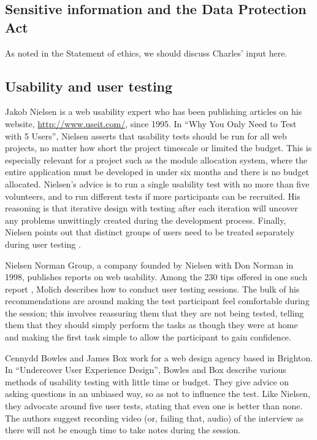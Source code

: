 \documentclass[]{scrartcl}
\begin{document}
\subsection{Sensitive information and the Data Protection Act}
\label{sec:dataprotection}

As noted in the Statement of ethics, we should discuss Charles' input here.

\subsection{Usability and user testing}

Jakob Nielsen is a web usability expert who has been publishing articles on
his website, \url{http://www.useit.com/}, since 1995. In ``Why You Only Need to
Test with 5 Users'', Nielsen asserts that usability tests should be run for all
web projects, no matter how short the project timescale or limited the budget.
This is especially relevant for a project such as the module allocation
system, where the entire application must be developed in under six months and
there is no budget allocated. Nielsen's advice is to run a single usability
test with no more than five volunteers, and to run different tests if more
participants can be recruited. His reasoning is that iterative design with
testing after each iteration will uncover any problems unwittingly created
during the development process. Finally, Nielsen points out that distinct
groups of users need to be treated separately during user testing
\cite{nielsen2000fiveusers}.

Nielsen Norman Group, a company founded by Nielsen with Don Norman in 1998,
publishes reports on web usability. Among the 230 tips offered in one such
report \cite{nng2001tipsusability}, Molich describes how to conduct user
testing sessions. The bulk of his recommendations are around making the test
participant feel comfortable during the session; this involves reassuring them
that they are not being tested, telling them that they should simply perform
the tasks as though they were at home and making the first task simple to
allow the participant to gain confidence.

Cennydd Bowles and James Box work for a web design agency based in Brighton.
In ``Undercover User Experience Design'', Bowles and Box describe various
methods of usability testing with little time or budget. They give advice on
asking questions in an unbiased way, so as not to influence the test. Like
Nielsen, they advocate around five user tests, stating that even one is better
than none. The authors suggest recording video (or, failing that, audio) of
the interview as there will not be enough time to take notes during the
session.
\end{document}
